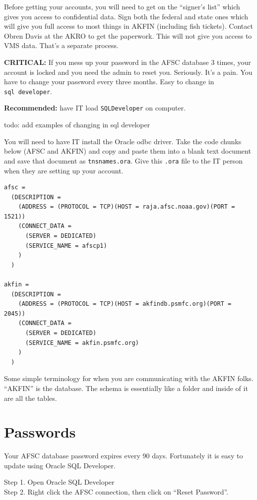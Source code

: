 \documentclass[
]{book}
\begin{document}
Before getting your accounts, you will need to get on the ``signer's list'' which gives you access to confidential data.
Sign both the federal and state ones which will give you full access to most things in AKFIN (including fish tickets).
Contact Obren Davis at the AKRO to get the paperwork.
This will not give you access to VMS data. That's a separate process.

\textbf{CRITICAL:} If you mess up your password in the AFSC database 3 times, your account is locked and you need the admin to reset you. Seriously.
It's a pain.
You have to change your password every three months. Easy to change in \texttt{sql\ developer}.

\textbf{Recommended:} have IT load \texttt{SQLDeveloper} on computer.

todo: add examples of changing in sql developer

You will need to have IT install the Oracle odbc driver.
Take the code chunks below (AFSC and AKFIN) and copy and paste them into a blank text document and save that document as \texttt{tnsnames.ora}.
Give this \texttt{.ora} file to the IT person when they are setting up your account.

\begin{verbatim}
afsc =
  (DESCRIPTION =
    (ADDRESS = (PROTOCOL = TCP)(HOST = raja.afsc.noaa.gov)(PORT = 1521))
    (CONNECT_DATA =
      (SERVER = DEDICATED)
      (SERVICE_NAME = afscp1)
    )
  )

akfin =
  (DESCRIPTION =
    (ADDRESS = (PROTOCOL = TCP)(HOST = akfindb.psmfc.org)(PORT = 2045))
    (CONNECT_DATA =
      (SERVER = DEDICATED)
      (SERVICE_NAME = akfin.psmfc.org)
    )
  )
\end{verbatim}

Some simple terminology for when you are communicating with the AKFIN folks. ``AKFIN'' is the database. The schema is essentially like a folder and inside of it are all the tables.

\hypertarget{passwords}{%
\section{Passwords}\label{passwords}}

Your AFSC database password expires every 90 days.
Fortunately it is easy to update using Oracle SQL Developer.

Step 1. Open Oracle SQL Developer\\
Step 2. Right click the AFSC connection, then click on ``Reset Password''.
\end{document}

